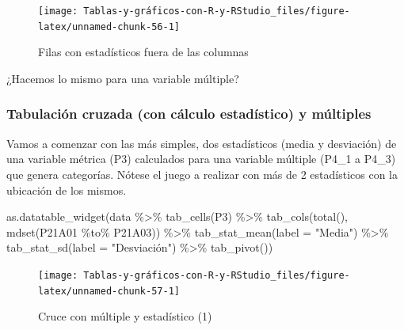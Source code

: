 \documentclass[
]{book}
\newenvironment{Shaded}{\begin{snugshade}}{\end{snugshade}}
\newcommand{\AttributeTok}[1]{\textcolor[rgb]{0.77,0.63,0.00}{#1}}
\newcommand{\FunctionTok}[1]{\textcolor[rgb]{0.00,0.00,0.00}{#1}}
\newcommand{\NormalTok}[1]{#1}
\newcommand{\SpecialCharTok}[1]{\textcolor[rgb]{0.00,0.00,0.00}{#1}}
\newcommand{\StringTok}[1]{\textcolor[rgb]{0.31,0.60,0.02}{#1}}
\begin{document}
\begin{figure}[H]

{\centering \texttt{[image: Tablas-y-gráficos-con-R-y-RStudio\_files/figure-latex/unnamed-chunk-56-1]} 

}

\caption{Filas con estadísticos fuera de las columnas}\label{fig:unnamed-chunk-56}
\end{figure}

¿Hacemos lo mismo para una variable múltiple?

\hypertarget{tabulaciuxf3n-cruzada-con-cuxe1lculo-estaduxedstico-y-muxfaltiples}{%
\subsubsection{Tabulación cruzada (con cálculo estadístico) y múltiples}\label{tabulaciuxf3n-cruzada-con-cuxe1lculo-estaduxedstico-y-muxfaltiples}}

Vamos a comenzar con las más simples, dos estadísticos (media y desviación) de una variable métrica (P3) calculados para una variable múltiple (P4\_1 a P4\_3) que genera categorías. Nótese el juego a realizar con más de 2 estadísticos con la ubicación de los mismos.

\begin{Shaded}
\begin{Highlighting}[]
\FunctionTok{as.datatable\_widget}\NormalTok{(data }\SpecialCharTok{\%\textgreater{}\%} \FunctionTok{tab\_cells}\NormalTok{(P3) }\SpecialCharTok{\%\textgreater{}\%} \FunctionTok{tab\_cols}\NormalTok{(}\FunctionTok{total}\NormalTok{(), }
  \FunctionTok{mdset}\NormalTok{(P21A01 }\SpecialCharTok{\%to\%}\NormalTok{ P21A03)) }\SpecialCharTok{\%\textgreater{}\%} \FunctionTok{tab\_stat\_mean}\NormalTok{(}\AttributeTok{label =} \StringTok{"Media"}\NormalTok{) }\SpecialCharTok{\%\textgreater{}\%} 
  \FunctionTok{tab\_stat\_sd}\NormalTok{(}\AttributeTok{label =} \StringTok{"Desviación"}\NormalTok{) }\SpecialCharTok{\%\textgreater{}\%} \FunctionTok{tab\_pivot}\NormalTok{())}
\end{Highlighting}
\end{Shaded}

\begin{figure}[H]

{\centering \texttt{[image: Tablas-y-gráficos-con-R-y-RStudio\_files/figure-latex/unnamed-chunk-57-1]} 

}

\caption{Cruce con múltiple y estadístico (1)}\label{fig:unnamed-chunk-57}
\end{figure}
\end{document}
